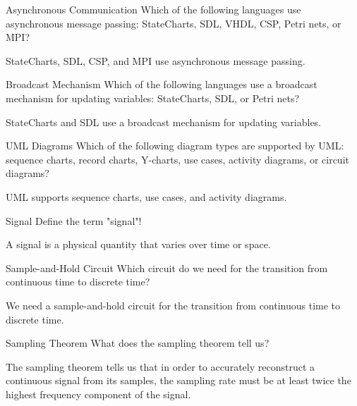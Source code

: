\documentclass{article}
\begin{document}
\begin{exercise}{Asynchronous Communication}
  Which of the following languages use asynchronous message passing: StateCharts, SDL, VHDL, CSP, Petri nets, or MPI?

  \begin{solution}
    StateCharts, SDL, CSP, and MPI use asynchronous message passing.
  \end{solution}
\end{exercise}

\begin{exercise}{Broadcast Mechanism}
  Which of the following languages use a broadcast mechanism for updating variables: StateCharts, SDL, or Petri nets?

  \begin{solution}
    StateCharts and SDL use a broadcast mechanism for updating variables.
  \end{solution}
\end{exercise}

\begin{exercise}{UML Diagrams}
  Which of the following diagram types are supported by UML: sequence charts, record charts, Y-charts, use cases, activity diagrams, or circuit diagrams?

  \begin{solution}
    UML supports sequence charts, use cases, and activity diagrams.
  \end{solution}
\end{exercise}


\begin{exercise}{Signal}
  Define the term "signal"!

  \begin{solution}
    A signal is a physical quantity that varies over time or space.
  \end{solution}
\end{exercise}

\begin{exercise}{Sample-and-Hold Circuit}
  Which circuit do we need for the transition from continuous time to discrete time?

  \begin{solution}
    We need a sample-and-hold circuit for the transition from continuous time to discrete time.
  \end{solution}
\end{exercise}

\begin{exercise}{Sampling Theorem}
  What does the sampling theorem tell us?

  \begin{solution}
    The sampling theorem tells us that in order to accurately reconstruct a continuous signal from its samples, the sampling rate must be at least twice the highest frequency component of the signal.
  \end{solution}
\end{exercise}
\end{document}
